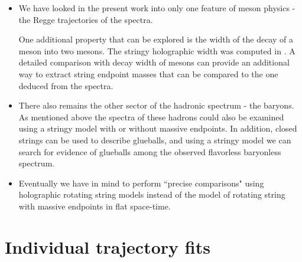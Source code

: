 \documentclass[11pt,a4]{article}
\begin{document}
\begin{itemize}
\item


We have looked in the present work into only one feature of meson physics - the Regge trajectories of the spectra.

One additional property that can be explored is the width of the decay of a meson into two mesons. The stringy holographic width was computed in \cite{Peeters:2005fq}. A detailed comparison with decay width of mesons can provide an additional way to extract string endpoint masses that can be compared to the one deduced from the spectra.

\item

There also remains the other sector of the hadronic spectrum - the baryons. As mentioned above the spectra of these hadrons could also be examined using a stringy model with or without massive endpoints. In addition, closed strings can be used to describe glueballs\cite{oai:arXiv.org:hep-th/0311190}, and using a stringy model we can search for evidence of glueballs among the observed flavorless baryonless spectrum.

\item

Eventually we have in mind to perform ``precise comparisons" using holographic rotating string models instead of the model of rotating string with massive endpoints in flat space-time.

\end{itemize}


\clearpage

\appendix

\section{Individual trajectory fits} \label{app:individual}
\end{document}
